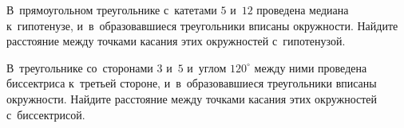 \begin{problems}
\item
В~прямоугольном треугольнике с~катетами $5$ и~$12$ проведена медиана
к~гипотенузе, и~в~образовавшиеся треугольники вписаны окружности.
Найдите расстояние между точками касания этих окружностей с~гипотенузой.

\item
В~треугольнике со~сторонами $3$ и~$5$ и~углом $120^\circ$ между ними проведена
биссектриса к~третьей стороне, и~в~образовавшиеся треугольники вписаны
окружности.
Найдите расстояние между точками касания этих окружностей с~биссектрисой.

\end{problems}

